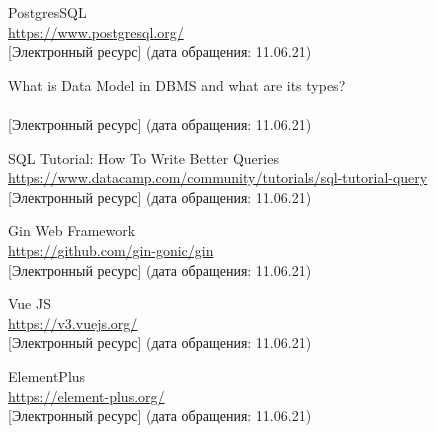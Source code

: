 % 
% 


\begin{thebibliography}{9}
    
    PostgresSQL
    \\\url{https://www.postgresql.org/}
    \\{[Электронный ресурс]} (дата обращения: 11.06.21)
    
    What is Data Model in DBMS and what are its types?
    \\
    \\{[Электронный ресурс]} (дата обращения: 11.06.21)

    \bibitem{}
    SQL Tutorial: How To Write Better Queries
    \\\url{https://www.datacamp.com/community/tutorials/sql-tutorial-query}
    \\{[Электронный ресурс]} (дата обращения: 11.06.21)

    \bibitem{}
    Gin Web Framework
    \\\url{https://github.com/gin-gonic/gin}
    \\{[Электронный ресурс]} (дата обращения: 11.06.21)

    \bibitem{}
    Vue JS
    \\\url{https://v3.vuejs.org/}
    \\{[Электронный ресурс]} (дата обращения: 11.06.21)

    \bibitem{}
    ElementPlus
    \\\url{https://element-plus.org/}
    \\{[Электронный ресурс]} (дата обращения: 11.06.21)

\end{thebibliography}
